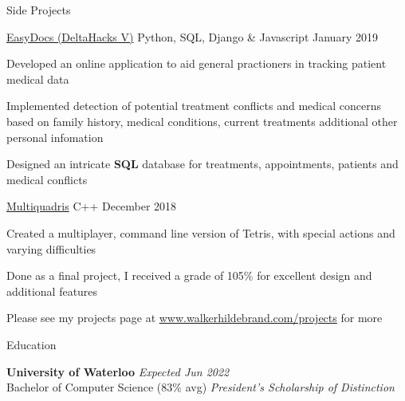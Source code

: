 \documentclass{resume} %
\begin{document}

\begin{rSection}{Side Projects}
    
    \begin{sideproject}
        {\href{https://github.com/wbhildeb/EasyDocs}{\faGithub{} EasyDocs (DeltaHacks V)}}
        {Python, SQL, Django \& Javascript}
        {January 2019}
        {
            \item Developed an online application to aid general practioners in tracking patient medical data
            \item Implemented detection of potential treatment conflicts and medical concerns based on family history, medical conditions, current treatments additional other personal infomation
            \item Designed an intricate \textbf{SQL} database for treatments, appointments, patients and medical conflicts
        }
    \end{sideproject}

    \begin{sideproject}
        {\href{https://github.com/wbhildeb/Multiquadris}{\faGithub{} Multiquadris}}
        {C++}
        {December 2018}
        {
            \item Created a multiplayer, command line version of Tetris, with special actions and varying difficulties
            \item Done as a final project, I received a grade of 105\% for excellent design and additional features
        }
    \end{sideproject}

    Please see my projects page at \href{http://www.walkerhildebrand.com/projects}{www.walkerhildebrand.com/projects} for more

\end{rSection}


\begin{rSection}{Education}

    {\bf University of Waterloo} \hfill {\em Expected Jun 2022} \\
    Bachelor of Computer Science (83\% avg) \hfill {\em President's Scholarship of Distinction}
    
\end{rSection}
\end{document}
